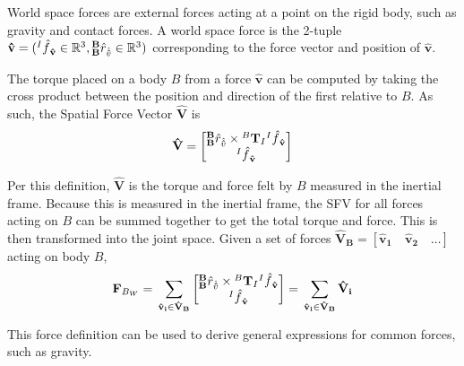 World space forces are external forces acting at a point on the rigid body, such as gravity and contact forces. A world space force is the 2-tuple $\mathbf{\hat{v}} = ({^I\hat{f}}_{\mathbf{\hat{v}}} \in \mathbb{R}^3, {^\mathbf{B}_\mathbf{B}}\hat{r}_{\hat{\mathbf{\hat{v}}}} \in \mathbb{R}^3)$ corresponding to the force vector and position of $\mathbf{\hat{v}}$. \newline

\noindent The torque placed on a body $B$ from a force $\mathbf{\hat{v}}$ can be computed by taking the cross product between the position and direction of the first relative to $B$. As such, the Spatial Force Vector $\mathbf{\hat{V}}$ is
\begin{align} \label{eqn:spat_force}
	\mathbf{\hat{V}} = \begin{bmatrix}                                                    
	{{^\mathbf{B}_\mathbf{B}}}\hat{r}_{\hat{\mathbf{\hat{v}}}} \times {^B\mathbf{T}_I}{^I\hat{f}}_{\mathbf{\hat{v}}} \\ {^I\hat{f}}_{\mathbf{\hat{v}}} 
	\end{bmatrix}                                                                     
\end{align}

\noindent Per this definition, $\mathbf{\hat{V}}$ is the torque and force felt by $B$ measured in the inertial frame. Because this is measured in the inertial frame, the SFV for all forces acting on $B$ can be summed together to get the total torque and force. This is then transformed into the joint space. Given a set of forces $\mathbf{\hat{V}_B} = \left [ \mathbf{\hat{v}_1} \quad \mathbf{\hat{v}_2} \quad \hdots \right ]$ acting on body $B$, 
\begin{align}
	{\mathbf{F}}_{B_W} = \Big.\sum_{\mathbf{\hat{v}_i} \in \mathbf{\hat{V}_B}}\begin{bmatrix}            
	{{^\mathbf{B}_\mathbf{B}}}\hat{r}_{\hat{\mathbf{\hat{v}}}} \times {^B\mathbf{T}_I}{^I\hat{f}}_{\mathbf{\hat{v}}}          \\ {^I\hat{f}}_{\mathbf{\hat{v}}} 
	\end{bmatrix} =  \Big.\sum_{\mathbf{\hat{v}_i} \in \mathbf{\hat{V}_B}}\mathbf{\hat{V}_i} 
\end{align}

\noindent This force definition can be used to derive general expressions for common forces, such as gravity.

